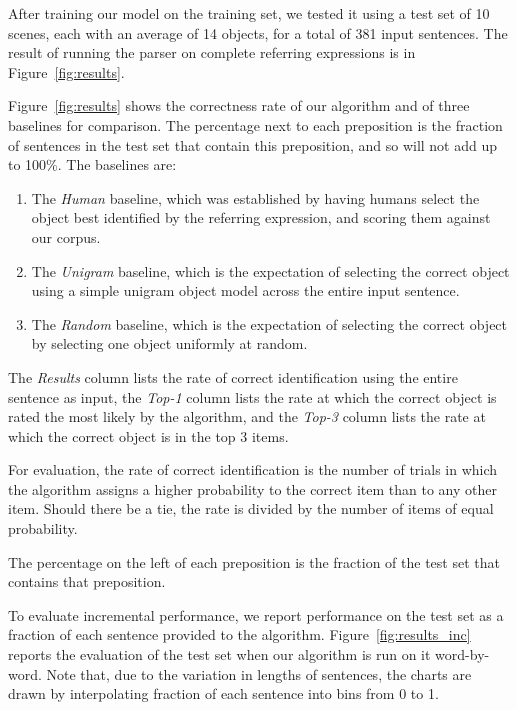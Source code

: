 \documentclass[conference]{IEEEtran}
\numberwithin{equation}{section}
\begin{document}
After training our model on the training set, we tested it using a test set of 10 scenes, each with an average of 14 objects, for a total of 381 input sentences. The result of running the parser on complete referring expressions is in Figure~\ref{fig:results}.

Figure~\ref{fig:results} shows the correctness rate of our algorithm and of three baselines for comparison. The percentage next to each preposition is the fraction of sentences in the test set that contain this preposition, and so will not add up to 100\%. The baselines are:
\begin{enumerate}[topsep=0pt,itemsep=-1ex,partopsep=1ex,parsep=1ex]
	\item The \emph{Human} baseline, which was established by having humans select the object best identified by the referring expression, and scoring them against our corpus.
	\item The \emph{Unigram} baseline, which is the expectation of selecting the correct object using a simple unigram object model across the entire input sentence.
	\item The \emph{Random} baseline, which is the expectation of selecting the correct object by selecting one object uniformly at random.
\end{enumerate}

The \emph{Results} column lists the rate of correct identification using the entire sentence as input, the \emph{Top-1} column lists the rate at which the correct object is rated the most likely by the algorithm, and the \emph{Top-3} column lists the rate at which the correct object is in the top 3 items.

For evaluation, the rate of correct identification is the number of trials in which the algorithm assigns a higher probability to the correct item than to any other item. Should there be a tie, the rate is divided by the number of items of equal probability.

The percentage on the left of each preposition is the fraction of the test set that contains that preposition.

To evaluate incremental performance, we report performance on the test set as a fraction of each sentence provided to the algorithm. Figure~\ref{fig:results_inc} reports the evaluation of the test set when our algorithm is run on it word-by-word. Note that, due to the variation in lengths of sentences, the charts are drawn by interpolating fraction of each sentence into bins from 0 to 1.
\end{document}
